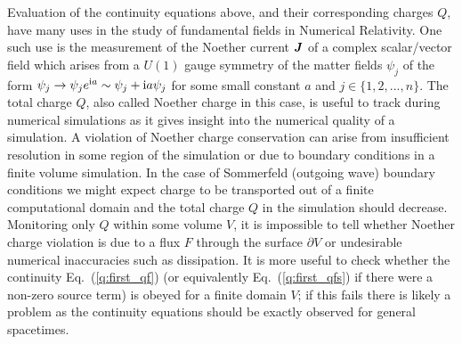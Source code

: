 Evaluation of the continuity equations above, and their corresponding charges ${Q}$, have many uses in the study of fundamental fields in Numerical Relativity. One such use is the measurement of the Noether current $\boldsymbol{J}$ of a complex scalar/vector field which arises from a $U(1)$ gauge symmetry of the matter fields $\psi_j$ of the form $\psi_j \rightarrow \psi_j e^{\mathrm{i}a} \sim \psi_j + 
{\rm i} a \psi_j$ for some small constant $a$ and $j \in \{1,2,...,n\}$. The total charge $Q$, also called Noether charge in this case, is useful to track during numerical simulations as it gives insight into the numerical quality of a simulation. A violation of Noether charge conservation can arise from insufficient resolution in some region of the simulation or due to boundary conditions in a finite volume simulation. In the case of Sommerfeld (outgoing wave) boundary conditions \cite{Alcubierre:2002kk} we might expect charge to be transported out of a finite computational domain and the total charge $Q$ in the simulation should decrease. Monitoring only ${Q}$ within some volume $V$, it is impossible to tell whether Noether charge violation is due to a flux ${F}$ through the surface $\partial V$ or undesirable numerical inaccuracies such as dissipation. It is more useful to check whether the continuity Eq.~(\ref{q:first_qf}) (or equivalently Eq.~(\ref{q:first_qfs}) if there were a non-zero source term) is obeyed for a finite domain $V$; if this fails there is likely a problem as the continuity equations should be exactly observed for general spacetimes. 

